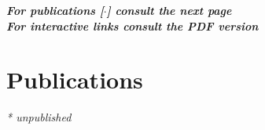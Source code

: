 \documentclass[letterpaper]{twentysecondcv} %
\begin{document}
\begin{flushright}
\textbf{\textit{For publications [$\cdot$] consult the next page}}
\\
\textbf{\textit{For interactive links consult the PDF version}}
\end{flushright}









\newpage







\section{Publications}

\nocite{*}

\printbibliography[heading=none,title={}]


\begin{flushright}
\textit{* unpublished}
\end{flushright}
\end{document}
